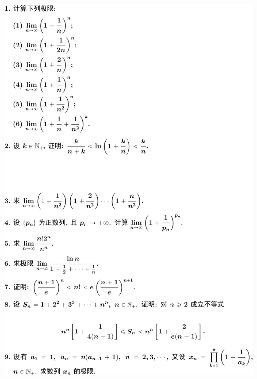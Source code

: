 \documentclass[11pt,a4paper]{ctexart}
\begin{document}
\begin{paracol}{2}
\includegraphics[width=\linewidth]{figure07.png}
\newpage
{}


\end{paracol}
\end{document}
